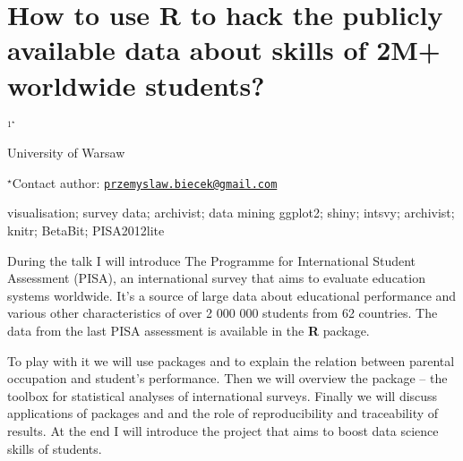 \documentclass[\main/boa.tex]{subfiles}
\begin{document}
\section{How to use R to hack the publicly available data about skills of 2M+
worldwide students?}

\begin{center}
  {\bf {}$^{1^\star}$}
\end{center}

\vskip 0.3cm

\begin{affiliations}
\begin{enumerate}
\begin{minipage}{0.915\textwidth}
\centering
\item University of Warsaw \\[-2pt]
\end{minipage}
\end{enumerate}
$^\star$Contact author: \href{mailto:przemyslaw.biecek@gmail.com}{\nolinkurl{przemyslaw.biecek@gmail.com}}\\
\end{affiliations}

\vskip 0.5cm

\begin{minipage}{0.915\textwidth}
\keywords visualisation; survey data; archivist; data mining
\packages ggplot2; shiny; intsvy; archivist; knitr; BetaBit; PISA2012lite
\end{minipage}

\vskip 0.8cm

During the talk I will introduce The Programme for International Student
Assessment (PISA), an international survey that aims to evaluate
education systems worldwide. It's a source of large data about
educational performance and various other characteristics of over 2 000
000 students from 62 countries. The data from the last PISA assessment
is available in the \textbf{R} package.

To play with it we will use packages and to explain the relation between
parental occupation and student's performance. Then we will overview the
package -- the toolbox for statistical analyses of international
surveys. Finally we will discuss applications of packages and and the
role of reproducibility and traceability of results. At the end I will
introduce the project that aims to boost data science skills of
students.
\end{document}
